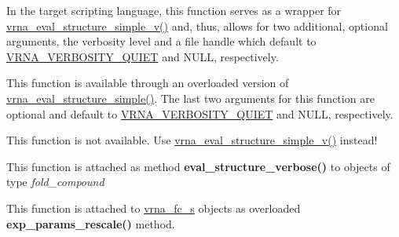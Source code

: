 \begin{DoxyRefList}
\item[\label{wrappers__wrappers000041}%
\Hypertarget{wrappers__wrappers000041}%
Global \hyperlink{group__eval_ga7e5273464b775d4130245681312c1369}{vrna\+\_\+eval\+\_\+structure\+\_\+simple} (const char $\ast$string, const char $\ast$structure)]In the target scripting language, this function serves as a wrapper for \hyperlink{group__eval_gacd6278343e77d13f1d53588e50d303bc}{vrna\+\_\+eval\+\_\+structure\+\_\+simple\+\_\+v()} and, thus, allows for two additional, optional arguments, the verbosity level and a file handle which default to \hyperlink{group__eval_gaf4afe19780b61b4962c613bde324128b}{V\+R\+N\+A\+\_\+\+V\+E\+R\+B\+O\+S\+I\+T\+Y\+\_\+\+Q\+U\+I\+ET} and N\+U\+LL, respectively.  
\item[\label{wrappers__wrappers000051}%
\Hypertarget{wrappers__wrappers000051}%
Global \hyperlink{group__eval_gacd6278343e77d13f1d53588e50d303bc}{vrna\+\_\+eval\+\_\+structure\+\_\+simple\+\_\+v} (const char $\ast$string, const char $\ast$structure, int verbosity\+\_\+level, F\+I\+LE $\ast$file)]This function is available through an overloaded version of \hyperlink{group__eval_ga7e5273464b775d4130245681312c1369}{vrna\+\_\+eval\+\_\+structure\+\_\+simple()}. The last two arguments for this function are optional and default to \hyperlink{group__eval_gaf4afe19780b61b4962c613bde324128b}{V\+R\+N\+A\+\_\+\+V\+E\+R\+B\+O\+S\+I\+T\+Y\+\_\+\+Q\+U\+I\+ET} and N\+U\+LL, respectively.  
\item[\label{wrappers__wrappers000049}%
\Hypertarget{wrappers__wrappers000049}%
Global \hyperlink{group__eval_gaf928bfd96767e1b8033a95a4cc432e39}{vrna\+\_\+eval\+\_\+structure\+\_\+simple\+\_\+verbose} (const char $\ast$string, const char $\ast$structure, F\+I\+LE $\ast$file)]This function is not available. Use \hyperlink{group__eval_gacd6278343e77d13f1d53588e50d303bc}{vrna\+\_\+eval\+\_\+structure\+\_\+simple\+\_\+v()} instead!  
\item[\label{wrappers__wrappers000033}%
\Hypertarget{wrappers__wrappers000033}%
Global \hyperlink{group__eval_ga0928d699d310178f84ee2351034e5cb5}{vrna\+\_\+eval\+\_\+structure\+\_\+verbose} (vrna\+\_\+fold\+\_\+compound\+\_\+t $\ast$vc, const char $\ast$structure, F\+I\+LE $\ast$file)]This function is attached as method {\bfseries eval\+\_\+structure\+\_\+verbose()} to objects of type {\itshape fold\+\_\+compound}  
\item[\label{wrappers__wrappers000086}%
\Hypertarget{wrappers__wrappers000086}%
Global \hyperlink{group__energy__parameters_gad607bc3a5b5da16400e2ca4ea5560233}{vrna\+\_\+exp\+\_\+params\+\_\+rescale} (vrna\+\_\+fold\+\_\+compound\+\_\+t $\ast$vc, double $\ast$mfe)]This function is attached to \hyperlink{group__fold__compound_structvrna__fc__s}{vrna\+\_\+fc\+\_\+s} objects as overloaded {\bfseries exp\+\_\+params\+\_\+rescale()} method.


\end{DoxyRefList}
